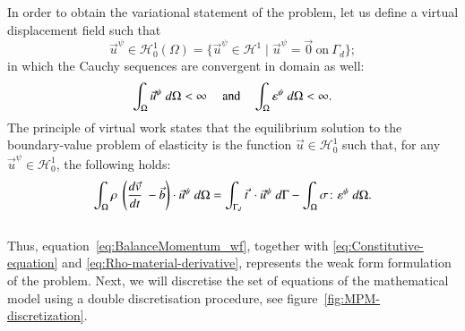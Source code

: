\documentclass[preprint,12pt,a4paper]{elsarticle}
\newcommand{\tens}[1]{
  \ensuremath{\mathbf{{#1}}}
}
\newcommand{\Integral}[2]{
  \IfStrEqCase{#1}{
    {2}{\ensuremath{\int_{\Gamma_d}{#2}\ d\Gamma}}
    {3}{\ensuremath{\int_{\Omega}{#2}\ d\Omega}}
  }
}
\begin{document}
In order to obtain the variational statement of the problem, let us define a
virtual displacement field such that
\begin{equation}
  \label{eq:Hilbert-space}
  \vec{u}^{\psi} \in \mathcal{H}^1_0(\Omega) = \{ \vec{u}^{\psi} \in
  \mathcal{H}^1 \mid \vec{u}^{\psi} = \vec{0}\ \text{on}\ \Gamma_d \};
\end{equation}
in which the Cauchy sequences are convergent in \gls{domain} as well:
\begin{equation}
  \label{eq:cauchy-secuence}
  \Integral{3}{\vec{u}^{\psi}} < \infty\ \quad\text{and}\quad
  \Integral{3}{\tens{\varepsilon}^{\psi}} < \infty.
\end{equation}
The principle of virtual work states that the equilibrium solution to
the boundary-value problem of elasticity is the function $\vec{u} \in
\mathcal{H}^1_0$ such that, for any $\vec{u}^{\psi} \in
\mathcal{H}^1_0$,
the following holds:
\begin{equation}
  \label{eq:BalanceMomentum_wf}
  \Integral{3}{\rho\ \left( \frac{d\vec{v}}{dt}\ - \vec{b} \right) \cdot \vec{u}^{\psi}} =
  \Integral{2}{\vec{t}\ \cdot \vec{u}^{\psi}} - \Integral{3}{\tens{\sigma} \colon
   \tens{\varepsilon}^{\psi}}.
\end{equation}\\
Thus, equation~\eqref{eq:BalanceMomentum_wf}, together with
\eqref{eq:Constitutive-equation} and
\eqref{eq:Rho-material-derivative}, represents the weak form
formulation of the problem. Next, we will discretise the set of equations of the mathematical model using a double discretisation procedure, see figure~\ref{fig:MPM-discretization}.\\
\end{document}
